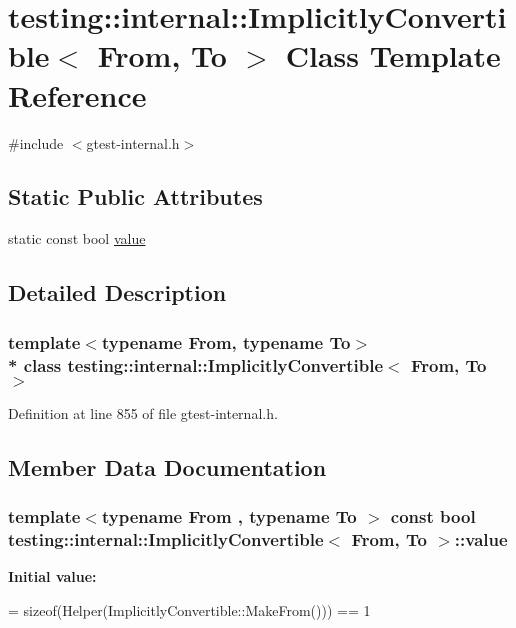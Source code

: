 \hypertarget{classtesting_1_1internal_1_1_implicitly_convertible}{}\section{testing\+:\+:internal\+:\+:Implicitly\+Convertible$<$ From, To $>$ Class Template Reference}
\label{classtesting_1_1internal_1_1_implicitly_convertible}


{\ttfamily \#include $<$gtest-\/internal.\+h$>$}

\subsection*{Static Public Attributes}
\begin{DoxyCompactItemize}
\item 
static const bool \hyperlink{classtesting_1_1internal_1_1_implicitly_convertible_aea51cecabca681fb75659e224771b7b7}{value}
\end{DoxyCompactItemize}


\subsection{Detailed Description}
\subsubsection*{template$<$typename From, typename To$>$\\*
class testing\+::internal\+::\+Implicitly\+Convertible$<$ From, To $>$}



Definition at line 855 of file gtest-\/internal.\+h.



\subsection{Member Data Documentation}
\subsubsection[{\texorpdfstring{value}{value}}]{\setlength{\rightskip}{0pt plus 5cm}template$<$typename From , typename To $>$ const bool {\bf testing\+::internal\+::\+Implicitly\+Convertible}$<$ From, {\bf To} $>$\+::value\hspace{0.3cm}{\ttfamily [static]}}\hypertarget{classtesting_1_1internal_1_1_implicitly_convertible_aea51cecabca681fb75659e224771b7b7}{}\label{classtesting_1_1internal_1_1_implicitly_convertible_aea51cecabca681fb75659e224771b7b7}
{\bfseries Initial value\+:}
\begin{DoxyCode}
=
      \textcolor{keyword}{sizeof}(Helper(ImplicitlyConvertible::MakeFrom())) == 1
\end{DoxyCode}


